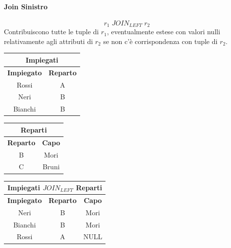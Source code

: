 \documentclass[../main.tex]{subfiles}
\begin{document}
	\paragraph{Join Sinistro}
	\[r_1 \; JOIN_{LEFT} \; r_2\]
	Contribuiscono tutte le tuple di $r_1$, eventualmente estese con valori nulli relativamente agli attributi di $r_2$ se non c’è corrispondenza con tuple di $r_2$.
	\begin{center}
		\begin{tabular}{ |c|c| }
			\hline
			\multicolumn{2}{|c|}{Impiegati}\\
			\hline
			\textbf{Impiegato} & \textbf{Reparto}\\
			\hline
			Rossi & A\\
			Neri & B\\
			Bianchi & B\\
			\hline
		\end{tabular}
		\begin{tabular}{ |c|c| }
			\hline
			\multicolumn{2}{|c|}{Reparti}\\
			\hline
			\textbf{Reparto} & \textbf{Capo}\\
			\hline
			B & Mori \\
			C & Bruni \\
			\hline
		\end{tabular}
	\end{center}
	\begin{center}
		\begin{tabular}{ |c|c|c| }
			\hline
			\multicolumn{3}{|c|}{Impiegati $JOIN_{LEFT}$ Reparti}\\
			\hline
			\textbf{Impiegato} & \textbf{Reparto} & \textbf{Capo}\\
			\hline
			Neri & B & Mori\\
			Bianchi & B & Mori\\
			Rossi & A & NULL\\
			\hline
		\end{tabular}
	\end{center}
\end{document}
